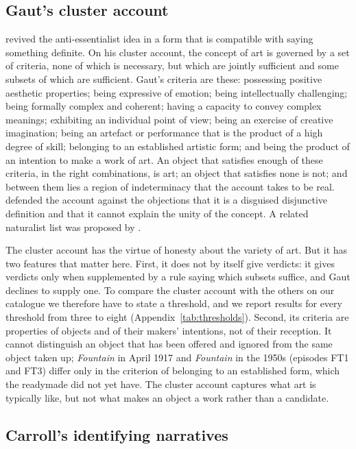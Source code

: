 \documentclass{situationist-preprint}
\begin{document}
\subsection{Gaut's cluster account}

\citet{Gaut2000} revived the anti-essentialist idea in a form that is compatible with saying something definite. On his cluster account, the concept of art is governed by a set of criteria, none of which is necessary, but which are jointly sufficient and some subsets of which are sufficient. Gaut's criteria are these: possessing positive aesthetic properties; being expressive of emotion; being intellectually challenging; being formally complex and coherent; having a capacity to convey complex meanings; exhibiting an individual point of view; being an exercise of creative imagination; being an artefact or performance that is the product of a high degree of skill; belonging to an established artistic form; and being the product of an intention to make a work of art. An object that satisfies enough of these criteria, in the right combinations, is art; an object that satisfies none is not; and between them lies a region of indeterminacy that the account takes to be real. \citet{Gaut2005} defended the account against the objections that it is a disguised disjunctive definition and that it cannot explain the unity of the concept. A related naturalist list was proposed by \citet{Dutton2006}.

The cluster account has the virtue of honesty about the variety of art. But it has two features that matter here. First, it does not by itself give verdicts: it gives verdicts only when supplemented by a rule saying which subsets suffice, and Gaut declines to supply one. To compare the cluster account with the others on our catalogue we therefore have to state a threshold, and we report results for every threshold from three to eight (Appendix~\ref{tab:thresholds}). Second, its criteria are properties of objects and of their makers' intentions, not of their reception. It cannot distinguish an object that has been offered and ignored from the same object taken up; \emph{Fountain} in April 1917 and \emph{Fountain} in the 1950s (episodes FT1 and FT3) differ only in the criterion of belonging to an established form, which the readymade did not yet have. The cluster account captures what art is typically like, but not what makes an object a work rather than a candidate.

\subsection{Carroll's identifying narratives}
\end{document}
